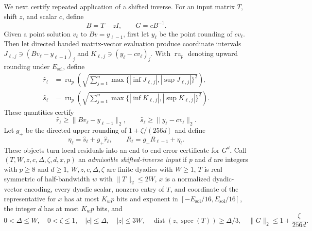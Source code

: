 \documentclass[11pt]{article}
\begin{document}
We next certify repeated application of a shifted inverse.  For an input
matrix $T$, shift $z$, and scalar $c$, define
\begin{equation}
 \label{eq:shifted-operator}
 B=T-zI,
 \qquad
 G=cB^{-1}.
\end{equation}
Given a point solution $v_\ell$ to $Bv=y_{\ell-1}$, first let $y_\ell$ be
the point rounding of $cv_\ell$.  Then let directed banded matrix-vector
evaluation produce coordinate intervals
$J_{\ell,j}\ni(Bv_\ell-y_{\ell-1})_j$ and
$K_{\ell,j}\ni(y_\ell-cv_\ell)_j$.  With $\operatorname{ru}_p$ denoting
upward rounding under $E_{\mathrm{sol}}$, define
\begin{align}
 \widehat r_\ell&=\operatorname{ru}_p\!\left(
  \sqrt{\sum_{j=1}^n
  \max\{|\inf J_{\ell,j}|,|\sup J_{\ell,j}|\}^2}\right),\\
 \widehat s_\ell&=\operatorname{ru}_p\!\left(
  \sqrt{\sum_{j=1}^n
  \max\{|\inf K_{\ell,j}|,|\sup K_{\ell,j}|\}^2}\right).
 \label{eq:directed-residual-radii}
\end{align}
These quantities certify
\begin{equation}
 \label{eq:solve-certificates}
 \widehat r_\ell\geq\lVert Bv_\ell-y_{\ell-1}\rVert_2,
 \qquad
 \widehat s_\ell\geq\lVert y_\ell-cv_\ell\rVert_2.
\end{equation}
Let $g_+$ be the directed upper rounding of $1+\zeta/(256d)$ and define
\begin{equation}
 \label{eq:radius-recurrence}
 \eta_\ell=\widehat s_\ell+g_+\widehat r_\ell,
 \qquad
 R_\ell=g_+R_{\ell-1}+\eta_\ell.
\end{equation}
These objects turn local residuals into an end-to-end error certificate for
$G^d$.  Call
$(T,W,z,c,\allowbreak\Delta,\zeta,d,\allowbreak x,p)$ an \emph{admissible
shifted-inverse input} if $p$ and $d$ are integers with $p\geq8$ and
$d\geq1$,
$W,z,c,\Delta,\zeta$ are finite dyadics with $W\geq1$, $T$ is real symmetric of
half-bandwidth $w$ with $\lVert T\rVert_2\leq2W$, $x$ is a normalized
dyadic-vector encoding, every dyadic scalar, nonzero entry of $T$, and
coordinate of the representative for $x$ has at most $K_wp$ bits and
exponent in $[-E_{\mathrm{sol}}/16,E_{\mathrm{sol}}/16]$, the integer $d$
has at most $K_wp$ bits, and
\[
 0<\Delta\leq W,\quad 0<\zeta\leq1,\quad
 |c|\leq\Delta,\quad |z|\leq3W,\quad
 \operatorname{dist}(z,\operatorname{spec}(T))\geq\Delta/3,
 \quad
 \lVert G\rVert_2\leq1+\frac{\zeta}{256d}.
\]
\end{document}
